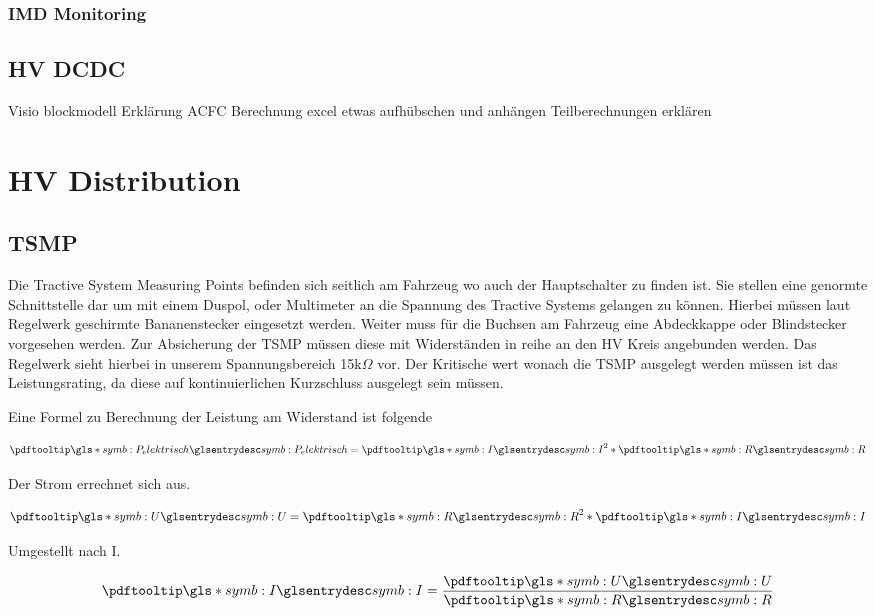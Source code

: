 \subsubsection{IMD Monitoring}

\subsection{HV DCDC}
Visio blockmodell
Erklärung ACFC
Berechnung excel etwas aufhübschen und anhängen
Teilberechnungen erklären

\section{HV Distribution}

\subsection{TSMP}
Die Tractive System Measuring Points befinden sich seitlich am Fahrzeug wo auch der Hauptschalter zu finden ist. Sie stellen eine genormte Schnittstelle dar um mit einem Duspol, oder Multimeter an die Spannung des Tractive Systems gelangen zu können. Hierbei müssen laut Regelwerk geschirmte Bananenstecker eingesetzt werden. Weiter muss für die Buchsen am Fahrzeug eine Abdeckkappe oder Blindstecker vorgesehen werden. Zur Absicherung der TSMP müssen diese mit Widerständen in reihe an den HV Kreis angebunden werden. Das Regelwerk sieht hierbei in unserem Spannungsbereich 15k$\Omega$ vor. Der Kritische wert wonach die TSMP ausgelegt werden müssen ist das Leistungsrating, da diese auf kontinuierlichen Kurzschluss ausgelegt sein müssen.

Eine Formel zu Berechnung der Leistung am Widerstand ist folgende

\begin{equation}
	\label{eqn:Leistung am Wiederstand}
	\glsc{symb:P_elektrisch} = \glsc{symb:I}^{2} * \glsc{symb:R}
\end{equation}

Der Strom errechnet sich aus.

\begin{equation}
	\label{eqn:URI}
	\glsc{symb:U} = \glsc{symb:R}^{2} * \glsc{symb:I}
\end{equation}

Umgestellt nach I.

\begin{equation}
	\label{eqn:IUR}
	\glsc{symb:I} = \dfrac{\glsc{symb:U}} {\glsc{symb:R}}
\end{equation}

